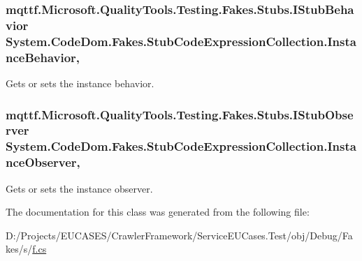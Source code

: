 \hypertarget{class_system_1_1_code_dom_1_1_fakes_1_1_stub_code_expression_collection_ac26254ee9297b6764c1cfec8debb778f}{
\subsubsection[{Instance\-Behavior}]{\setlength{\rightskip}{0pt plus 5cm}mqttf.\-Microsoft.\-Quality\-Tools.\-Testing.\-Fakes.\-Stubs.\-I\-Stub\-Behavior System.\-Code\-Dom.\-Fakes.\-Stub\-Code\-Expression\-Collection.\-Instance\-Behavior\hspace{0.3cm}{\ttfamily [get]}, {\ttfamily [set]}}}\label{class_system_1_1_code_dom_1_1_fakes_1_1_stub_code_expression_collection_ac26254ee9297b6764c1cfec8debb778f}


Gets or sets the instance behavior.

\hypertarget{class_system_1_1_code_dom_1_1_fakes_1_1_stub_code_expression_collection_a2190b7bb115960b458f1d0de4474399e}{
\subsubsection[{Instance\-Observer}]{\setlength{\rightskip}{0pt plus 5cm}mqttf.\-Microsoft.\-Quality\-Tools.\-Testing.\-Fakes.\-Stubs.\-I\-Stub\-Observer System.\-Code\-Dom.\-Fakes.\-Stub\-Code\-Expression\-Collection.\-Instance\-Observer\hspace{0.3cm}{\ttfamily [get]}, {\ttfamily [set]}}}\label{class_system_1_1_code_dom_1_1_fakes_1_1_stub_code_expression_collection_a2190b7bb115960b458f1d0de4474399e}


Gets or sets the instance observer.



The documentation for this class was generated from the following file\-:\begin{DoxyCompactItemize}
\item 
D\-:/\-Projects/\-E\-U\-C\-A\-S\-E\-S/\-Crawler\-Framework/\-Service\-E\-U\-Cases.\-Test/obj/\-Debug/\-Fakes/s/\hyperlink{s_2f_8cs}{f.\-cs}\end{DoxyCompactItemize}
